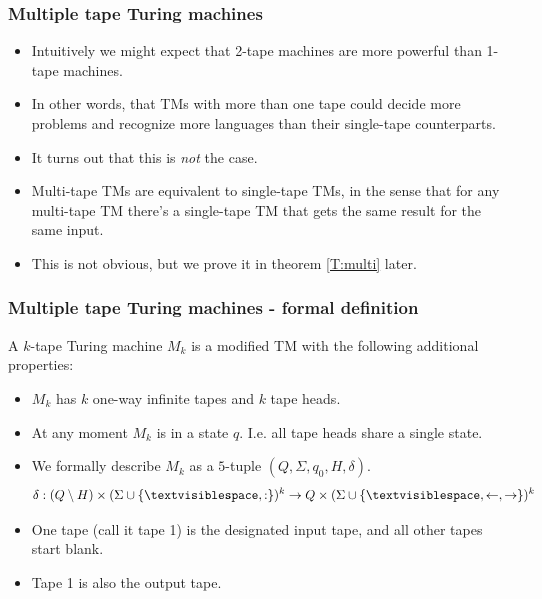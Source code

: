\documentclass[handout]{beamer}
\newcommand{\tvs}{\textvisiblespace}
\newcommand{\ra}{\rightarrow}
\newcommand{\la}{\leftarrow}
\begin{document}
\begin{frame}
\frametitle{Multiple tape Turing machines}
\begin{itemize}
\item Intuitively we might expect that 2-tape machines are more powerful than 1-tape machines. 
\vspace{0.2cm}
\item In other words, that TMs with more than one tape could decide more problems and recognize more languages than their single-tape counterparts. 
\vspace{0.2cm}
\item It turns out that this is \emph{not} the case. 
\vspace{0.2cm}
\item Multi-tape TMs are equivalent to single-tape TMs, in the sense that for any multi-tape TM there's a single-tape TM that gets the same result for the same input.
\vspace{0.2cm}
\item This is not obvious, but we prove it in theorem \ref{T:multi} later.
\end{itemize}

\end{frame}

\begin{frame}
\frametitle{Multiple tape Turing machines - formal definition}
\begin{definition}
A $k$-tape Turing machine $M_k$ is a modified TM with the following additional properties:
\vspace{0.1cm}
\begin{itemize}
\item $M_k$ has $k$ one-way infinite tapes and $k$ tape heads. 
\vspace{0.1cm}
\item At any moment $M_k$ is in a state $q$. I.e. all tape heads share a single state.
\vspace{0.1cm}
\item We formally describe $M_k$ as a $5$-tuple $(Q,\Sigma,q_0,H,\delta)$.
\begin{equation*}\delta:(Q\setminus H)\times (\Sigma\cup\{\tvs,:\})^k\to Q\times (\Sigma\cup \{\tvs,\la,\ra\})^k\end{equation*}
\item One tape (call it tape 1) is the designated input tape, and all other tapes start blank.
\vspace{0.1cm}
\item Tape 1 is also the output tape.
\end{itemize}
\end{definition}

\end{frame}
\end{document}
